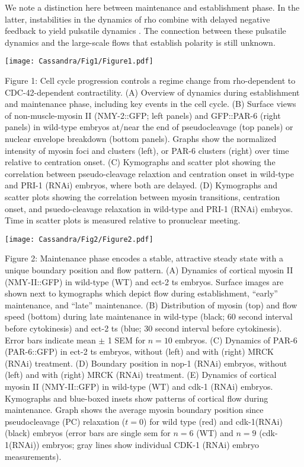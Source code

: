 \documentclass[11pt]{article}
\newcommand{\6}[1]{#1_{\text{6}}}
\newcommand{\3}[1]{#1_{\text{3}}}
\begin{document}
We note a distinction here between maintenance and establishment phase. In the latter, instabilities in the dynamics of rho combine with delayed negative feedback to yield pulsatile dynamics \citep{nishikawa2017controlling, michaux2018excitable, michaud2022versatile}. The connection between these pulsatile dynamics and the large-scale flows that establish polarity is still unknown.

\newpage 
\begin{center}
\texttt{[image: Cassandra/Fig1/Figure1.pdf]}
\end{center}

\newpage 
Figure 1: Cell cycle progression controls a regime change from rho-dependent to CDC-42-dependent contractility. (A) Overview of dynamics during establishment and maintenance phase, including key events in the cell cycle. (B) Surface views of non-muscle-myosin II (NMY-2::GFP; left panels) and GFP::PAR-6 (right panels) in wild-type embryos at/near the end of pseudocleavage (top panels) or nuclear envelope breakdown (bottom panels). Graphs show the normalized intensity of myosin foci and clusters (left), or PAR-6 clusters (right) over time relative to centration onset. (C) Kymographs and scatter plot showing the correlation between pseudo-cleavage relaxtion and centration onset in wild-type and PRI-1 (RNAi) embryos, where both are delayed. (D) Kymographs and scatter plots showing the correlation between myosin transitions, centration onset, and psuedo-cleavage relaxation in wild-type and PRI-1 (RNAi) embryos. Time in scatter plots is measured relative to pronuclear meeting.

\newpage 
\begin{center}
\texttt{[image: Cassandra/Fig2/Figure2.pdf]}
\end{center}


\newpage
Figure 2: Maintenance phase encodes a stable, attractive steady state with a unique boundary position and flow pattern. (A) Dynamics of cortical myosin II (NMY-II::GFP) in wild-type (WT) and ect-2 ts embryos. Surface images are shown next to kymographs which depict flow during establishment, ``early'' maintenance, and ``late'' maintenance. (B) Distribution of myosin (top) and flow speed (bottom) during late maintenance in wild-type (black; 60 second interval before cytokinesis) and ect-2 ts (blue; 30 second interval before cytokinesis). Error bars indicate mean $\pm$ 1 SEM for $n=10$ embryos. (C) Dynamics of PAR-6 (PAR-6::GFP) in ect-2 ts embryos, without (left) and with (right) MRCK (RNAi) treatment. (D) Boundary position in nop-1 (RNAi) embryos, without (left) and with (right) MRCK (RNAi) treatment. (E) Dynamics of cortical myosin II (NMY-II::GFP) in wild-type (WT) and cdk-1 (RNAi) embryos. Kymographs and blue-boxed insets show patterns of cortical flow during maintenance. Graph shows the average myosin boundary position since pseudocleavage (PC) relaxation ($t=0$) for wild type (red) and cdk-1(RNAi) (black) embryos (error bars are single sem for $n=6$ (WT) and $n=9$ (cdk-1(RNAi)) embryos; gray lines show individual CDK-1 (RNAi) embryo measurements). 
\end{document}
